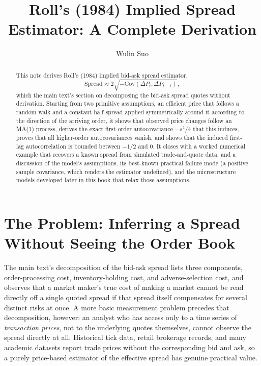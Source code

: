 \documentclass[11pt]{article}
\title{Roll's (1984) Implied Spread Estimator: A Complete Derivation}
\author{Wulin Suo}
\date{}
\theoremstyle{remark}
\theoremstyle{definition}
\begin{document}
\maketitle

\begin{abstract}
\noindent This note derives Roll's (1984) implied bid-ask spread estimator,
\begin{equation*}
\text{Spread} \approx 2\sqrt{-\text{Cov}(\Delta P_t, \Delta P_{t-1})},
\end{equation*}
which the main text's section on decomposing the bid-ask spread quotes without derivation. Starting from two primitive assumptions, an efficient price that follows a random walk and a constant half-spread applied symmetrically around it according to the direction of the arriving order, it shows that observed price changes follow an MA(1) process, derives the exact first-order autocovariance $-s^2/4$ that this induces, proves that all higher-order autocovariances vanish, and shows that the induced first-lag autocorrelation is bounded between $-1/2$ and $0$. It closes with a worked numerical example that recovers a known spread from simulated trade-and-quote data, and a discussion of the model's assumptions, its best-known practical failure mode (a positive sample covariance, which renders the estimator undefined), and the microstructure models developed later in this book that relax those assumptions.
\end{abstract}

\section{The Problem: Inferring a Spread Without Seeing the Order Book}
\label{sec:setup}

The main text's decomposition of the bid-ask spread lists three components, order-processing cost, inventory-holding cost, and adverse-selection cost, and observes that a market maker's true cost of making a market cannot be read directly off a single quoted spread if that spread itself compensates for several distinct risks at once. A more basic measurement problem precedes that decomposition, however: an analyst who has access only to a time series of \emph{transaction prices}, not to the underlying quotes themselves, cannot observe the spread directly at all. Historical tick data, retail brokerage records, and many academic datasets report trade prices without the corresponding bid and ask, so a purely price-based estimator of the effective spread has genuine practical value.
\end{document}
